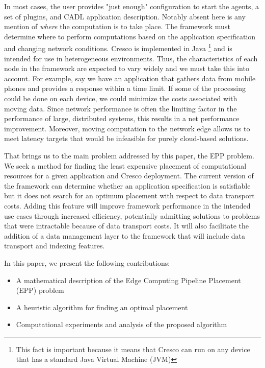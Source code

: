 \documentclass{article}
\begin{document}
    In most cases, the user provides "just enough" configuration to start the agents, a set of plugins, and CADL application description. Notably absent here is any mention of \textit{where} the computation is to take place. The framework must determine where to perform computations based on the application specification and changing network conditions. Cresco is implemented in Java \footnote{This fact is important because it means that Cresco can run on any device that has a standard Java Virtual Machine (JVM)}
    and is intended for use in heterogeneous environments. Thus, the characteristics of each node in the framework are expected to vary widely and we must take this into account. For example, say we have an application that gathers data from mobile phones and provides a response within a time limit. If some of the processing could be done on each device, we could minimize the costs associated with moving data. Since network performance is often the limiting factor in the performance of large, distributed systems, this results in a net performance improvement. Moreover, moving computation to the network edge allows us to meet latency targets that would be infeasible for purely cloud-based solutions.
    
    That brings us to the main problem addressed by this paper, the EPP problem.  We seek a method for finding the least expensive placement of computational resources for a given application and Cresco deployment. The current version of the framework can determine whether an application specification is satisfiable but it does not search for an optimum placement with respect to data transport costs. Adding this feature will improve framework performance in the intended use cases through increased efficiency, potentially admitting solutions to problems that were intractable because of data transport costs. It will also facilitate the addition of a data management layer to the framework that will include data transport and indexing features.
    
    In this paper, we present the following contributions:
    \begin{itemize}
    	\item A mathematical description of the Edge Computing Pipeline Placement (EPP) problem
    	\item A heuristic algorithm for finding an optimal placement
 	    \item Computational experiments and analysis of the proposed algorithm
    \end{itemize}
    
\end{document}
